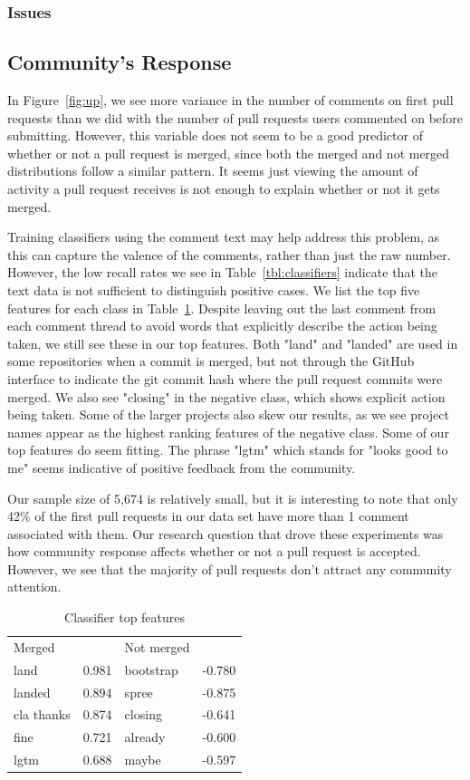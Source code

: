\documentclass{sigchi}
\begin{document}
\subsubsection{Issues}


\subsection{Community's Response} In Figure~\ref{fig:up}, we see more variance
in the number of comments on first pull requests than we did with the number of
pull requests users commented on before submitting. However, this variable does
not seem to be a good predictor of whether or not a pull request is merged,
since both the merged and not merged distributions follow a similar pattern. It
seems just viewing the amount of activity a pull request receives is not enough
to explain whether or not it gets merged.

Training classifiers using the comment text may help address this problem, as
this can capture the valence of the comments, rather than just the raw number.
However, the low recall rates we see in Table~\ref{tbl:classifiers} indicate
that the text data is not sufficient to distinguish positive cases. We list the
top five features for each class in Table~\ref{tbl:features}. Despite leaving
out the last comment from each comment thread to avoid words that explicitly
describe the action being taken, we still see these in our top features. Both
"land" and "landed" are used in some repositories when a commit is merged, but
not through the GitHub interface to indicate the git commit hash where the pull
request commits were merged. We also see "closing" in the negative class, which
shows explicit action being taken. Some of the larger projects also skew our
results, as we see project names appear as the highest ranking features of the
negative class. Some of our top features do seem fitting. The phrase "lgtm"
which stands for "looks good to me" seems indicative of positive feedback from
the community.

Our sample size of 5,674 is relatively small, but it is interesting to note that
only 42\% of the first pull requests in our data set have more than 1 comment
associated with them. Our research question that drove these experiments was how
community response affects whether or not a pull request is accepted. However,
we see that the majority of pull requests don't attract any community attention.

\begin{table}[ht] \centering
\caption{Classifier top features}
\label{tbl:features}
\begin{tabular}{ll|ll}
\hline\hline
Merged  & ~     & Not merged  & ~      \\
land    & 0.981 & bootstrap & -0.780 \\
landed  & 0.894 & spree   & -0.875 \\
cla thanks    & 0.874 & closing & -0.641 \\
fine    & 0.721 &  already & -0.600 \\
lgtm    & 0.688 & maybe & -0.597 \\
\hline
\end{tabular}
\end{table}
\end{document}
